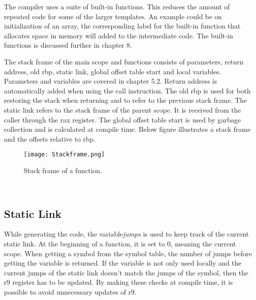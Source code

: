 \documentclass{article}
\begin{document}
The compiler uses a suite of built-in functions. This reduces the amount of repeated code for some of the larger templates. An example could be on initialization of an array, the corresponding label for the built-in function that allocates space in memory will added to the intermediate code. The built-in functions is discussed further in chapter 8. 

The stack frame of the main scope and functions consists of parameters, return address, old rbp, static link, global offset table start and local variables. Parameters and variables are covered in chapter 5.2. Return address is automatically added when using the call instruction. The old rbp is used for both restoring the stack when returning and to refer to the previous stack frame. The static link refers to the stack frame of the parent scope. It is received from the caller through the rax register. The global offset table start is used by garbage collection and is calculated at compile time. Below figure illustrates a stack frame and the offsets relative to rbp.

\begin{figure}[h]
    \centering
    \texttt{[image: Stackframe.png]}
    \caption{Stack frame of a function.}
    \label{fig:my_label}
\end{figure}

\
\subsection{Static Link}
While generating the code, the variable\textit{jumps} is used to keep track of the current static link. At the beginning of a function, it is set to 0, meaning the current scope. When getting a symbol from the symbol table, the number of jumps before getting the variable is returned. If the variable is not only used locally and the current jumps of the static link doesn't match the jumps of the symbol, then the r9 register has to be updated. By making these checks at compile time, it is possible to avoid unnecessary updates of r9.
\end{document}
